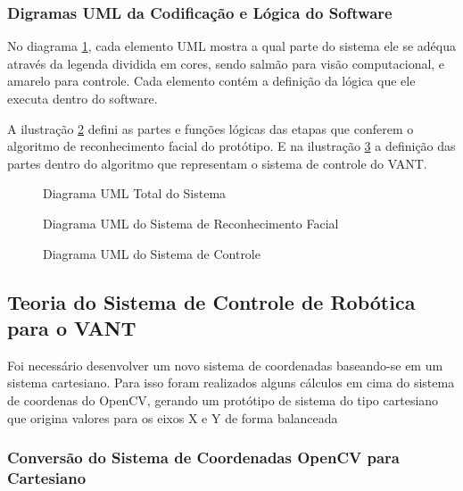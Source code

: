 \subsubsection{Digramas UML da Codificação e Lógica do Software}

No diagrama \ref{fig:diasist}, cada elemento UML mostra a qual parte do sistema ele se adéqua através da legenda dividida em cores, sendo salmão para visão computacional, e amarelo para controle. Cada elemento contém a definição da lógica que ele executa dentro do software.

A ilustração \ref{fig:diagvisao} defini as partes e funções lógicas das etapas que conferem o algoritmo de reconhecimento facial do protótipo. E na ilustração \ref{fig:diagcont} a definição das partes dentro do algoritmo que representam o sistema de controle do VANT. 

\begin{figure}[H]
	\centering	
	\caption{Diagrama UML Total do Sistema}
	\fontsize{9pt}{12pt}\selectfont
	\def\svgwidth{13cm}
	
	\label{fig:diasist}
\end{figure}

\begin{figure}[H]
	\centering	
	\caption{Diagrama UML do Sistema de Reconhecimento Facial}
	\fontsize{9pt}{12pt}\selectfont
	\def\svgwidth{10cm}
	
	\label{fig:diagvisao}
\end{figure}

\begin{figure}[H]
	\centering	
	\caption{Diagrama UML do Sistema de Controle}
	\fontsize{9pt}{12pt}\selectfont
	\def\svgwidth{8cm}
	
	\label{fig:diagcont}
\end{figure}
\subsection{Teoria do Sistema de Controle de Robótica para o VANT}

Foi necessário desenvolver um novo sistema de coordenadas baseando-se em um sistema cartesiano. Para isso foram realizados alguns cálculos em cima do sistema de coordenas do OpenCV, gerando um protótipo de sistema do tipo cartesiano que origina valores para os eixos X e Y de forma balanceada 

\subsubsection{Conversão do Sistema de Coordenadas OpenCV para Cartesiano}

